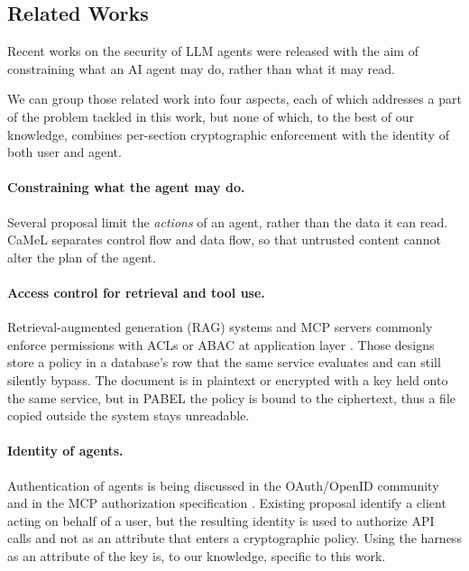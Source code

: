 \subsection{Related Works}\label{related}
Recent works on the security of LLM agents were released with the aim of constraining what an AI agent may do, rather than what it may read.

We can group those related work into four aspects, each of which addresses a part of the problem tackled in this work, but none of which, to the best of our knowledge, combines per-section cryptographic enforcement with the identity of both user and agent.

\paragraph{Constraining what the agent may do.}
Several proposal limit the \emph{actions} of an agent, rather than the data it can read. CaMeL \cite{debenedetti2025defeating} separates control flow and data flow, so that untrusted content cannot alter the plan of the agent.

\paragraph{Access control for retrieval and tool use.}
Retrieval-augmented generation (RAG) \cite{bhatt2025enterpriseaienforceparticipantaware} systems and MCP servers commonly enforce permissions with ACLs or ABAC at application layer \cite{nist800162, bhatt2025enterpriseaienforceparticipantaware}.
Those designs store a policy in a database's row that the same service evaluates and can still silently bypass.
The document is in plaintext or encrypted with a key held onto the same service, but in PABEL the policy is bound to the ciphertext, thus a file copied outside the system stays unreadable.

\paragraph{Identity of agents.}
Authentication of agents is being discussed in the OAuth/OpenID community \cite{oauth-ai-agents-on-behalf-of-user-02} and in the MCP authorization specification \cite{mcpspec}.
Existing proposal identify a client acting on behalf of a user, but the resulting identity is used to authorize API calls and not as an attribute that enters a cryptographic policy.
Using the harness as an attribute of the key is, to our knowledge, specific to this work.


